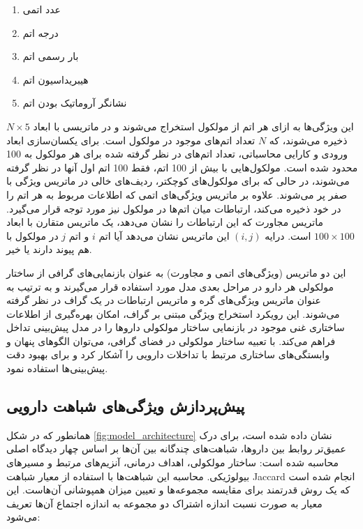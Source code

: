 \begin{enumerate}
	\item عدد اتمی
	\item درجه اتم 
	\item بار رسمی اتم
	\item هیبریداسیون اتم
	\item نشانگر آروماتیک بودن اتم
\end{enumerate}

این ویژگی‌ها به ازای هر اتم از مولکول استخراج می‌شوند و در ماتریسی با ابعاد $N \times 5$ ذخیره می‌شوند، که $N$ تعداد اتم‌های موجود در مولکول است. برای یکسان‌سازی ابعاد ورودی و کارایی محاسباتی، تعداد اتم‌های در نظر گرفته شده برای هر مولکول به 100 محدود شده است. مولکول‌هایی با بیش از 100 اتم، فقط 100 اتم اول آنها در نظر گرفته می‌شوند، در حالی که برای مولکول‌های کوچکتر، ردیف‌های خالی در ماتریس ویژگی با صفر پر می‌شوند. علاوه بر ماتریس ویژگی‌های اتمی که اطلاعات مربوط به هر اتم را در خود ذخیره می‌کند، ارتباطات میان اتم‌ها در مولکول نیز مورد توجه قرار می‌گیرد. ماتریس مجاورت که این ارتباطات را نشان می‌دهد، یک ماتریس متقارن با ابعاد $100 \times 100$ است. درایه $(i,j)$ این ماتریس نشان می‌دهد آیا اتم $i$ و اتم $j$ در مولکول با هم پیوند دارند یا خیر.

این دو ماتریس (ویژگی‌های اتمی و مجاورت) به عنوان بازنمایی‌های گرافی از ساختار مولکولی هر دارو در مراحل بعدی مدل مورد استفاده قرار می‌گیرند و به ترتیب به عنوان ماتریس ویژگی‌های گره و ماتریس ارتباطات در یک گراف در نظر گرفته می‌شوند. این رویکرد استخراج ویژگی مبتنی بر گراف، امکان بهره‌گیری از اطلاعات ساختاری غنی موجود در بازنمایی ساختار مولکولی داروها را در مدل پیش‌بینی تداخل فراهم می‌کند. با تعبیه ساختار مولکولی در فضای گرافی، می‌توان الگوهای پنهان و وابستگی‌های ساختاری مرتبط با تداخلات دارویی را آشکار کرد و برای بهبود دقت پیش‌بینی‌ها استفاده نمود.

\subsection{پیش‌پردازش ویژگی‌های شباهت دارویی}


همانطور که در شکل \ref{fig:model_architecture} نشان داده شده است، برای درک عمیق‌تر روابط بین داروها، شباهت‌های چندگانه بین آن‌ها بر اساس چهار دیدگاه اصلی محاسبه شده است: ساختار مولکولی، اهداف درمانی، آنزیم‌های مرتبط و مسیرهای بیولوژیکی. محاسبه این شباهت‌ها با استفاده از معیار شباهت Jaccard \cite{ref_kumari2024} انجام شده است که یک روش قدرتمند برای مقایسه مجموعه‌ها و تعیین میزان همپوشانی آن‌هاست. این معیار به صورت نسبت اندازه اشتراک دو مجموعه به اندازه اجتماع آن‌ها تعریف می‌شود:

